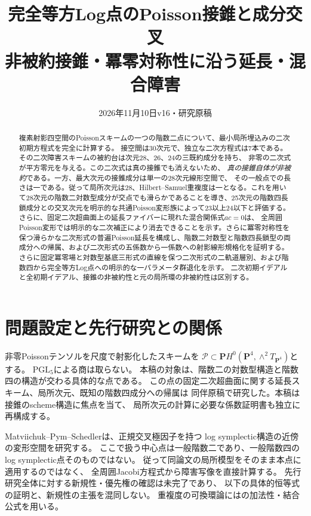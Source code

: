 \documentclass[a4paper,11pt]{ltjsarticle}
\title{完全等方Log点のPoisson接錐と成分交叉\\
\large 非被約接錐・冪零対称性に沿う延長・混合障害}
\author{}
\date{2026年11月10日\quad v16・研究原稿}
\theoremstyle{remark}\newtheorem{remark}[theorem]{注意}
\newcommand{\PP}{\mathbf P}\newcommand{\CC}{\mathbf C}\newcommand{\QQ}{\mathbf Q}
\begin{document}
\maketitle
\begin{abstract}
複素射影四空間のPoissonスキームの一つの階数二点について、最小局所埋込みの二次初期方程式を完全に計算する。
接空間は30次元で、独立な二次方程式は7本である。
その二次障害スキームの被約台は次元28、26、24の三既約成分を持ち、
非零の二次式が平方零元を与える。この二次式は真の接錐でも消えないため、
\emph{真の接錐自体が非被約}である。一方、最大次元の接錐成分は単一の28次元線形空間で、
その一般点での長さは一である。従って局所次元は28、Hilbert--Samuel重複度は一となる。これを用いて28次元の階数二対数型成分が交点でも滑らかであることを導き、25次元の階数四長鎖成分との交叉次元を明示的な共通Poisson変形族によって23以上24以下と評価する。
さらに、固定二次超曲面上の延長ファイバーに現れた混合関係式$ac=0$は、
全周囲Poisson変形では明示的な二次補正により消去できることを示す。さらに冪零対称性を保つ滑らかな二次形式の普遍Poisson延長を構成し、階数二対数型と階数四長鎖型の両成分への帰属、および二次形式の五係数から一係数への射影線形規格化を証明する。さらに固定冪零場と対数型基底三形式の直線を保つ二次形式の二軌道層別、および階数四から完全等方Log点への明示的な一パラメータ群退化を示す。
二次初期イデアルと全初期イデアル、接錐の非被約性と元の局所環の非被約性は区別する。
\end{abstract}

\section{問題設定と先行研究との関係}
非零Poissonテンソルを尺度で射影化したスキームを
$\mathcal P\subset\PP H^0(\PP^4,\wedge^2T_{\PP^4})$とする。
$\mathrm{PGL}_5$による商は取らない。
本稿の対象は、階数二の対数型構造と階数四の構造が交わる具体的な点である。
この点の固定二次超曲面に関する延長スキーム、局所次元、既知の階数四成分への帰属は
同伴原稿\cite{Incidence}で研究した。本稿は接錐のscheme構造に焦点を当て、
局所次元の計算に必要な係数証明書も独立に再構成する。

Matviichuk--Pym--Schedler\cite{MPS}は、正規交叉極因子を持つ
log symplectic構造の近傍の変形空間を研究する。
ここで扱う中心点は一般階数二であり、一般階数四のlog symplectic点そのものではない。
従って同論文の局所模型をそのまま本点に適用するのではなく、
全周囲Jacobi方程式から障害写像を直接計算する。
先行研究全体に対する新規性・優先権の確認は未完了であり、
以下の具体的恒等式の証明と、新規性の主張を混同しない。
重複度の可換環論には\cite{StacksMult}の加法性・結合公式を用いる。
\end{document}
